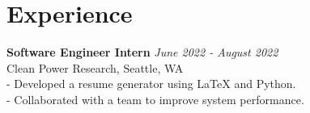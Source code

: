 \section*{Experience}
\textbf{Software Engineer Intern} \hfill \textit{June 2022 - August 2022} \\
Clean Power Research, Seattle, WA \\
- Developed a resume generator using LaTeX and Python. \\
- Collaborated with a team to improve system performance. \\[0.5em]